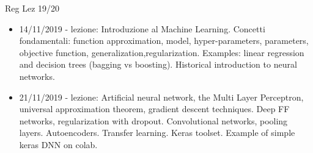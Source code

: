 \begin{frame}[allowframebreaks]{Reg Lez 19/20}
\begin{itemize}[resume]
\item 14/11/2019 - lezione: Introduzione al Machine Learning. Concetti fondamentali: function approximation, model, hyper-parameters, parameters, objective function, generalization,regularization. Examples: linear regression and decision trees (bagging vs boosting). Historical introduction to neural networks.
\item 21/11/2019 - lezione: Artificial neural network, the Multi Layer Perceptron, universal approximation theorem, gradient descent techniques. Deep FF networks, regularization with dropout. Convolutional networks, pooling layers. Autoencoders. Transfer learning. Keras toolset. Example of simple keras DNN on colab.
\end{itemize}



\end{frame}
